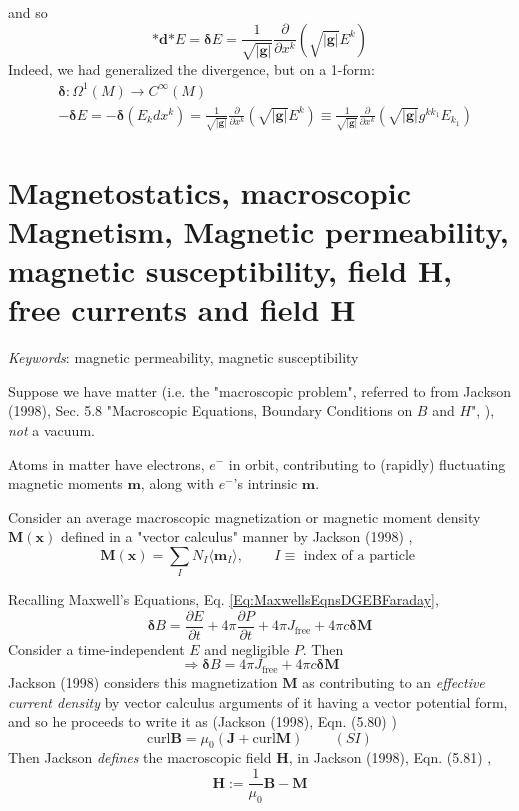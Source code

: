 \documentclass[10pt]{amsart}
\begin{document}
\begin{multicols*}{2}
\[\]
and so 
\[
\mathbf{*} \mathbf{d} \mathbf{*} E = \mathbf{\delta} E = \frac{1}{\sqrt{ |\mathbf{g} | } } \frac{ \partial }{ \partial x^k} ( \sqrt{ | \mathbf{g} | } E^k )
\]
Indeed, we had generalized the divergence, but on a 1-form:
\begin{equation}
\begin{aligned}
	& \mathbf{\delta} : \Omega^1(M) \to C^{\infty}(M) \\ 
	& -\mathbf{\delta} E = -\mathbf{\delta} (E_kdx^k)  = \frac{1}{\sqrt{|\mathbf{g} |} } \frac{ \partial }{ \partial x^k} (\sqrt{ |\mathbf{g} | } E^k) \equiv \frac{1}{\sqrt{ |\mathbf{g} | } } \frac{ \partial }{ \partial x^k} ( \sqrt{ |\mathbf{g} | }  g^{kk_1} E_{k_1} )
\end{aligned}
\end{equation}

\section{Magnetostatics, macroscopic Magnetism, Magnetic permeability, magnetic susceptibility, field $\mathbf{H}$, free currents and field $\mathbf{H}$}

\emph{Keywords}: magnetic permeability, magnetic susceptibility

Suppose we have matter (i.e. the "macroscopic problem", referred to from Jackson (1998), Sec. 5.8 "Macroscopic Equations, Boundary Conditions on $B$ and $H$", \cite{Jack1998}), \emph{not} a vacuum.  

Atoms in matter have electrons, $e^-$ in orbit, contributing to (rapidly) fluctuating magnetic moments $\mathbf{m}$, along with $e^-$'s intrinsic $\mathbf{m}$.  

Consider an average macroscopic magnetization or magnetic moment density $\mathbf{M}(\mathbf{x})$ defined in a "vector calculus" manner by Jackson (1998) \cite{Jack1998}, 
\[
\mathbf{M}(\mathbf{x}) = \sum_I N_I\langle \mathbf{m}_I\rangle , \qquad \, I \equiv \text{ index of a particle } 
\]

Recalling Maxwell's Equations, Eq. \ref{Eq:MaxwellsEqnsDGEBFaraday}, 
\[
\mathbf{\delta} B = \frac{ \partial E}{ \partial t} + 4\pi \frac{ \partial P }{ \partial t} + 4\pi J_{\text{free}} + 4\pi c \mathbf{\delta}\mathbf{M}
\]
Consider a time-independent $E$ and negligible $P$.  Then 
\[
\Longrightarrow \mathbf{\delta} B =  4\pi J_{\text{free}} + 4\pi c \mathbf{\delta}\mathbf{M}
\]
Jackson (1998) \cite{Jack1998} considers this magnetization $\mathbf{M}$ as contributing to an \emph{effective current density} by vector calculus arguments of it having a vector potential form, and so he proceeds to write it as (Jackson (1998), Eqn. (5.80) \cite{Jack1998})
\[
\text{curl} \mathbf{B} = \mu_0 (\mathbf{J} + \text{curl}\mathbf{M} ) \qquad \, (SI)
\]
Then Jackson \emph{defines} the macroscopic field $\mathbf{H}$, in Jackson (1998), Eqn. (5.81) \cite{Jack1998}, 
\[
\mathbf{H} := \frac{1}{\mu_0} \mathbf{B} - \mathbf{M}
\]


\end{multicols*}
\end{document}
